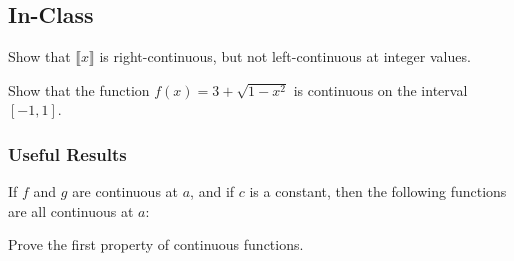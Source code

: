 \documentclass[notes]{subfiles}
\begin{document}
		\newsec
	\subsection*{In-Class}

		\begin{ex}
			Show that $\llbracket x \rrbracket$ is right-continuous, but not left-continuous at integer values.
		\end{ex}
			\newpage
			
		\begin{ex}
			Show that the function $f(x) = 3+\sqrt{1-x^2}$ is continuous on the interval $[-1,1]$.
		\end{ex}
			
	\subsubsection*{Useful Results}
		\begin{thm}
			If $f$ and $g$ are continuous at $a$, and if $c$ is a constant, then the following functions are all continuous at $a$:
		\end{thm}
			\newpage
			
		\begin{ex}
			Prove the first property of continuous functions.
		\end{ex}
			
\end{document}
